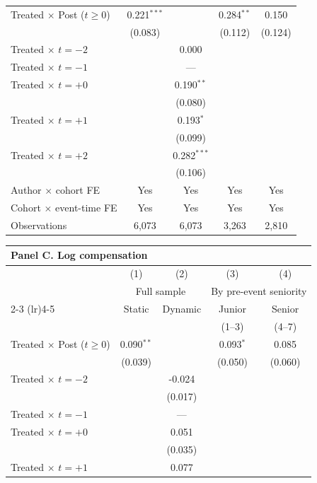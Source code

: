 \begin{center}
\begin{table}
\begin{tabular}{lcccc}
\midrule
\quad Treated $\times$ Post ($t\geq 0$) & 0.221$^{***}$ &  & 0.284$^{**}$ & 0.150 \\
 & (0.083) &  & (0.112) & (0.124) \\
\addlinespace
\quad Treated $\times$ $t=-2$ &  & 0.000 &  &  \\
\quad Treated $\times$ $t=-1$ & & --- & & \\
\quad Treated $\times$ $t=+0$ &  & 0.190$^{**}$ &  &  \\
 &  & (0.080) &  &  \\
\quad Treated $\times$ $t=+1$ &  & 0.193$^{*}$ &  &  \\
 &  & (0.099) &  &  \\
\quad Treated $\times$ $t=+2$ &  & 0.282$^{***}$ &  &  \\
 &  & (0.106) &  &  \\
\midrule
Author $\times$ cohort FE & Yes & Yes & Yes & Yes \\
Cohort $\times$ event-time FE & Yes & Yes & Yes & Yes \\
Observations & 6,073 & 6,073 & 3,263 & 2,810 \\
\bottomrule
\end{tabular}
\end{table}
\nomarkersintext
\begin{table}[t]
\vspace{-9cm}
\begin{tabular}{lcccc}
\multicolumn{5}{l}{\textbf{Panel C. Log compensation}} \\[2pt]
\toprule
 & (1) & (2) & (3) & (4) \\
 & \multicolumn{2}{c}{Full sample} & \multicolumn{2}{c}{By pre-event seniority} \\
\cmidrule(lr){2-3} \cmidrule(lr){4-5}
 & Static & Dynamic & Junior & Senior \\
 & & & \small(1--3) & \small(4--7) \\
\midrule
\quad Treated $\times$ Post ($t\geq 0$) & 0.090$^{**}$ &  & 0.093$^{*}$ & 0.085 \\
 & (0.039) &  & (0.050) & (0.060) \\
\addlinespace
\quad Treated $\times$ $t=-2$ &  & -0.024 &  &  \\
 &  & (0.017) &  &  \\
\quad Treated $\times$ $t=-1$ & & --- & & \\
\quad Treated $\times$ $t=+0$ &  & 0.051 &  &  \\
 &  & (0.035) &  &  \\
\quad Treated $\times$ $t=+1$ &  & 0.077 &  &  \\

\end{tabular}
\end{table}
\end{center}
